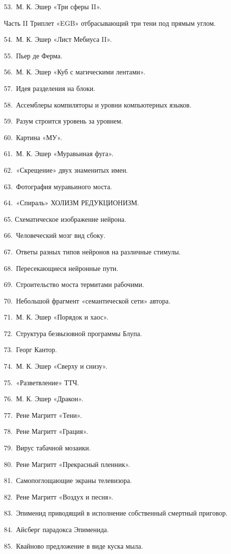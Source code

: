 \documentclass[../main.tex]{subfiles}
\begin{document}
53.~М. К. Эшер «Три сферы II».

Часть II Триплет «EGB» отбрасывающий три тени под прямым углом.

54.~М. К. Эшер «Лист Мебиуса II».

55.~Пьер де Ферма.

56.~М. К. Эшер «Куб с магическими лентами».

57.~Идея разделения на блоки.

58.~Ассемблеры компиляторы и уровни компьютерных языков.

59.~Разум строится уровень за уровнем.

60.~Картина «МУ».

61.~М. К. Эшер «Муравьиная фуга».

62.~«Скрещение» двух знаменитых имен.

63.~Фотография муравьиного моста.

64.~«Спираль» ХОЛИЗМ РЕДУКЦИОНИЗМ.

65. Схематическое изображение нейрона.

66.~Человеческий мозг вид сбоку.

67.~Ответы разных типов нейронов на различные стимулы.

68.~Пересекающиеся нейронные пути.

69.~Строительство моста термитами рабочими.

70.~Небольшой фрагмент «семантической сети» автора.

71.~М. К. Эшер «Порядок и хаос».

72.~Структура безвызовной программы Блупа.

73.~Георг Кантор.

74.~М. К. Эшер «Сверху и снизу».

75.~«Разветвление» ТТЧ.

76.~М. К. Эшер «Дракон».

77.~Рене Магритт «Тени».

78.~Рене Магритт «Грация».

79.~Вирус табачной мозаики.

80.~Рене Магритт «Прекрасный пленник».

81.~Самопоглощающие экраны телевизора.

82.~Рене Магритт «Воздух и песня».

83.~Эпименид приводящий в исполнение собственный смертный приговор.

84.~Айсберг парадокса Эпименида.

85.~Квайново предложение в виде куска мыла.
\end{document}
